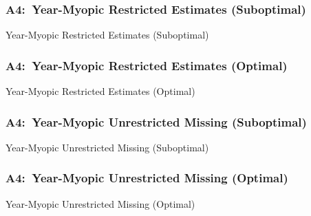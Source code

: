 \documentclass[12pt, aspectratio=169]{beamer}
\begin{document}
\begin{frame}[label=ymres]
\frametitle{A4:\ Year-Myopic Restricted Estimates (Suboptimal)}
\begin{table}[htbp]
  \centering
  \renewcommand{\thetable}{\arabic{table}a}
  \caption{Year-Myopic Restricted Estimates (Suboptimal)}
  \vspace{5pt}
  \begin{adjustbox}{totalheight=.7\textheight}

  \end{adjustbox}
\end{table}%
\hyperlink{ysres}{}
\end{frame}

\begin{frame}[label=ymreo]
\frametitle{A4:\ Year-Myopic Restricted Estimates (Optimal)}
\addtocounter{framenumber}{-1}
\begin{table}[htbp]
  \centering
  \addtocounter{table}{-1}
  \renewcommand{\thetable}{\arabic{table}b}
  \caption{Year-Myopic Restricted Estimates (Optimal)}
  \vspace{5pt}
  \begin{adjustbox}{totalheight=.7\textheight}

  \end{adjustbox}
\end{table}%
\hyperlink{ysreo}{}
\end{frame}

\begin{frame}[label=ymums]
\frametitle{A4:\ Year-Myopic Unrestricted Missing (Suboptimal)}
\begin{table}[htbp]
  \centering
  \renewcommand{\thetable}{\arabic{table}a}
  \caption{Year-Myopic Unrestricted Missing (Suboptimal)}
  \vspace{5pt}
  \begin{adjustbox}{totalheight=.7\textheight}

  \end{adjustbox}
\end{table}%
\hyperlink{ydues}{}
\end{frame}

\begin{frame}[label=ymumo]
\frametitle{A4:\ Year-Myopic Unrestricted Missing (Optimal)}
\addtocounter{framenumber}{-1}
\begin{table}[htbp]
  \centering
  \addtocounter{table}{-1}
  \renewcommand{\thetable}{\arabic{table}b}
  \caption{Year-Myopic Unrestricted Missing (Optimal)}
  \vspace{5pt}
  \begin{adjustbox}{totalheight=.7\textheight}

  \end{adjustbox}
\end{table}%
\hyperlink{ydueo}{}
\end{frame}
\end{document}
